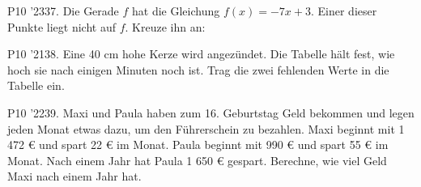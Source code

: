 \documentclass[11pt]{article}
\begin{document}
\pfgruppe{}
\begin{pfaufg}{P10 ’23}{37.}{}
Die Gerade $f$ hat die Gleichung $f(x) = -7x + 3$. Einer dieser Punkte liegt nicht auf $f$. Kreuze ihn an:
\end{pfaufg}
\pfgruppe{}
\begin{pfaufg}{P10 ’21}{38.}{}
Eine 40 cm hohe Kerze wird angezündet. Die Tabelle hält fest, wie hoch sie nach einigen Minuten noch ist. Trag die zwei fehlenden Werte in die Tabelle ein.
\par\smallskip\noindent {}\par
{}
\end{pfaufg}
\pfgruppe{}
\begin{pfaufg}{P10 ’22}{39.}{}
Maxi und Paula haben zum 16. Geburtstag Geld bekommen und legen jeden Monat etwas dazu, um den Führerschein zu bezahlen. Maxi beginnt mit 1 472 € und spart 22 € im Monat. Paula beginnt mit 990 € und spart 55 € im Monat. Nach einem Jahr hat Paula 1 650 € gespart. Berechne, wie viel Geld Maxi nach einem Jahr hat.
\par\smallskip\noindent {}\par
{}
\end{pfaufg}
\pfgruppe{}
\end{document}
